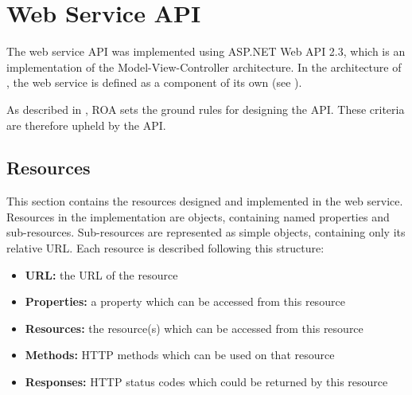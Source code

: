 \section{Web Service API}\label{design:web_service}
The web service API was implemented using ASP.NET Web API 2.3\cite{aspnet_webapi}, which is an implementation of the Model-View-Controller architecture.
In the architecture of \projectname{}, the web service is defined as a component of its own (see ).

As described in , ROA sets the ground rules for designing the API.
These criteria are therefore upheld by the API.



\subsection{Resources}\label{webservice:resources}
This section contains the resources designed and implemented in the web service.
Resources in the implementation are objects, containing named properties and sub-resources.
Sub-resources are represented as simple objects, containing only its relative URL.
Each resource is described following this structure:
\begin{itemize}
\item \textbf{URL:} the URL of the resource
\item \textbf{Properties:} a property which can be accessed from this resource
\item \textbf{Resources:} the resource(s) which can be accessed from this resource
\item \textbf{Methods:} HTTP methods which can be used on that resource
\item \textbf{Responses:} HTTP status codes which could be returned by this resource
\end{itemize}

